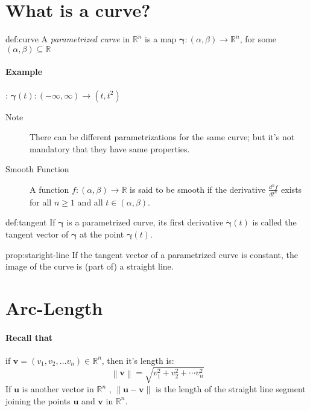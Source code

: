 \documentclass{notes}
\newcommand{\norm}[1]{\left\lVert #1 \right \rVert}
\begin{document}
\section{What is a curve?}

\begin{definition}{def:curve}
	A \textit{parametrized curve} in \(\mathbb{R}^n\) is a map \(\bm{\gamma}: (\alpha, \beta) \to \mathbb{R}^n\), for some \((\alpha, \beta) \subseteq \mathbb{R}\)
	
\paragraph{Example}: \(\bm{\gamma}(t): (-\infty, \infty) \to (t, t^2)\)
\end{definition}

\begin{description}
	\item[Note] There can be different parametrizations for the same curve; but it's not mandatory that they have same properties.
	\item[Smooth Function] 
	 A function \(f: (\alpha, \beta) \to \mathbb{R}\) is said to be
	smooth if the derivative \(\frac{d^n f}{dt^n}\) exists for all $n \geq 1$ and all $t \in (\alpha, \beta)$.
\end{description}
\begin{definition}{def:tangent}
	If \(\bm{\gamma}\) is a parametrized curve, its first derivative \(\dot{\bm{\gamma}}(t)\) is called the tangent vector
	of \(\bm{\gamma}\) at the point \(\bm{\gamma}\)$(t)$.
\end{definition}

\begin{proposition}{prop:staright-line}
	If the tangent vector of a parametrized curve is constant, the image of the curve
	is (part of) a straight line.
\end{proposition}


\section{Arc-Length}
\paragraph{Recall that} if \(\mathbf{v} = (v_1, v_2, \ldots v_n) \in \mathbb{R}^n\), then it's length is:
\[ \norm{\mathbf{v}} = \sqrt{v_1 ^2 + v_2 ^2 + \cdots v_n ^2}\] 
If \(\mathbf{u}\) is another vector in \(\mathbb{R}^n\) , \(\norm{\mathbf{u} - \mathbf{v}}\) is the length of the straight line segment joining the points \(\mathbf{u}\) and \(\mathbf{v}\) in \(\mathbb{R}^n\).
\end{document}
